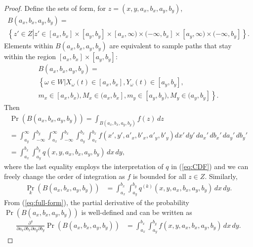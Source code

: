 \begin{proof}
  Define the sets of form, for $z = (x,y,a_x,b_x,a_y,b_y)$,
  \begin{multline*}
    B(a_x, b_x, a_y, b_y) = \\
    \left\{ z' \in Z \left| z' \in [a_x, b_x]
        \times [a_y, b_y] \times [a_x, \infty) \times (-\infty, b_x]
                            \times [a_y, \infty) \times (-\infty, b_y] \right.\right\}.
  \end{multline*}
  Elements within $B(a_x, b_x, a_y, b_y)$ are equivalent to sample
  paths that stay within the region $[a_x, b_x] \times [a_y, b_y]$:
  \begin{multline*}
    B(a_x, b_x, a_y, b_y) = \\
    \left\{ \omega \in W | X_\omega(t) \in [a_x, b_x], Y_\omega(t) \in [a_y, b_y], \right. \\
    \left. m_x \in [a_x,b_x), M_x \in (a_x, b_x], m_y \in [a_y,b_y), M_y \in (a_y, b_y] \right\}.
  \end{multline*}
  Then
  \begin{multline}
    \Pr(B(a_x, b_x, a_y, b_y)) = \displaystyle \int_{B(a_x, b_x, a_y, b_y)} f(z)\, dz  \\
    = \displaystyle \int_{a_y}^{\infty} \displaystyle \int_{-\infty}^{b_y} \displaystyle \int_{a_x}^{\infty} \displaystyle \int_{-\infty}^{b_x} \displaystyle \int_{a_y}^{b_x} \displaystyle \int_{a_x}^{b_x} f(x', y', a'_x, b'_x, a'_y, b'_y) dx'\, dy'\, da_x'\, db_x'\, da_y'\, db_y'   \\
    = \displaystyle \int_{a_x}^{b_x} \displaystyle \int_{a_y}^{b_y} q(x,y,a_x,b_x,a_y,b_y)\, dx\, dy, \label{eq:full-form}
  \end{multline}
  where the last equality employs the interpretation of $q$ in
  (\ref{eq:CDF}) and we can freely change the order of integration as
  $f$ is bounded for all $z \in Z$. Similarly,
  \begin{align*}
    \Pr_k(B(a_x, b_x, a_y, b_y)) &= \displaystyle \int_{a_x}^{b_x} \displaystyle \int_{a_y}^{b_y} q^{(k)}(x,y,a_x,b_x,a_y,b_y)\, dx\, dy.
  \end{align*}
  From (\ref{eq:full-form}), the partial derivative of the probability
  $\Pr(B(a_x,b_x,a_y,b_y))$ is well-defined and can be written as
  \begin{align*}
    \frac{\partial^4}{\partial a_x \partial b_x \partial a_y \partial b_y} \Pr(B(a_x, b_x, a_y, b_y)) &= \displaystyle \int_{a_x}^{b_x} \displaystyle \int_{a_y}^{b_y} f(x,y,a_x,b_x,a_y,b_y)\, dx\, dy.
  \end{align*}

\end{proof}
